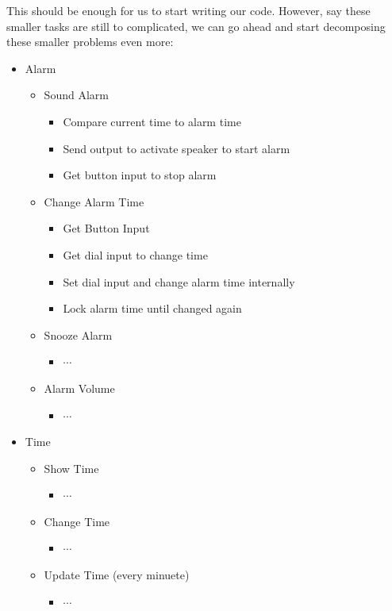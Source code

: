 \documentclass[12pt,a4paper]{book}
\begin{document}
				This should be enough for us to start writing our code. However, say these smaller tasks are still to complicated, we can go ahead and start decomposing these smaller problems even more:
				\begin{itemize}
					\item Alarm 
						\begin{itemize}
							\item Sound Alarm
								\begin{itemize}
									\item Compare current time to alarm time
									\item Send output to activate speaker to start alarm
									\item Get button input to stop alarm
								\end{itemize}
							\item Change Alarm Time
								\begin{itemize}
									\item Get Button Input
									\item Get dial input to change time
									\item Set dial input and change alarm time internally
									\item Lock alarm time until changed again
								\end{itemize}
							\item Snooze Alarm
								\begin{itemize}
									\item $\cdots$
								\end{itemize}
							\item Alarm Volume
								\begin{itemize}
									\item $\cdots$
								\end{itemize}
						\end{itemize}
					\item Time
						\begin{itemize}
							\item Show Time
								\begin{itemize}
									\item $\cdots$
								\end{itemize}
							\item Change Time
								\begin{itemize}
									\item $\cdots$
								\end{itemize}
							\item Update Time (every minuete)
							\begin{itemize}
								\item $\cdots$
							\end{itemize}
						\end{itemize}
				\end{itemize}
\end{document}
